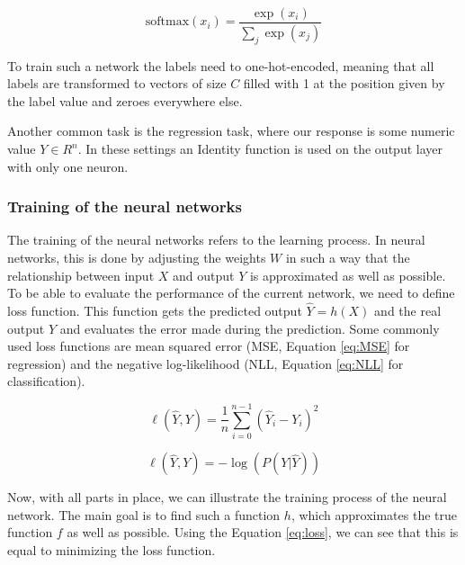 \begin{equation}
    \text{softmax}(x_{i}) = \frac{\exp(x_i)}{\sum_j \exp(x_j)}
    \label{eq:softmax}
\end{equation}

To train such a network the labels need to one-hot-encoded, meaning that all labels are transformed to vectors of size $C$ filled with 1 at the position given by the label value and zeroes everywhere else.

Another common task is the regression task, where our response is some numeric value $Y \in R^n$.
In these settings an Identity function is used on the output layer with only one neuron.

\subsubsection{Training of the neural networks}
The training of the neural networks refers to the learning process.
In neural networks, this is done by adjusting the weights $W$ in such a way that the relationship between input $X$ and output $Y$ is approximated as well as possible.
To be able to evaluate the performance of the current network, we need to define loss function.
This function gets the predicted output $\hat{Y} = h(X)$ and the real output $Y$ and evaluates the error made during the prediction.
Some commonly used loss functions are mean squared error (MSE, Equation \ref{eq:MSE} for regression) and the negative log-likelihood (NLL, Equation \ref{eq:NLL} for classification).

\begin{equation}
    \ell(\hat{Y}, Y) = \frac{1}{n} \sum_{i=0}^{n-1} (\hat{Y}_i - Y_{i})^2 
    \label{eq:MSE}
\end{equation}

\begin{equation}
    \ell(\hat{Y}, Y) = -\log(P(Y|\hat{Y}))
    \label{eq:NLL}
\end{equation}

Now, with all parts in place, we can illustrate the training process of the neural network.
The main goal is to find such a function $h$, which approximates the true function $f$ as well as possible.
Using the Equation \ref{eq:loss}, we can see that this is equal to minimizing the loss function.

